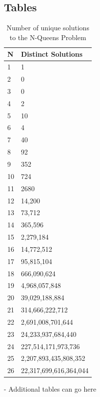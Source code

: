\documentclass{sig-alternate}
\begin{document}
\subsection{Tables} \label{tablesection}
\begin{table}
\centering
\caption{Number of unique solutions to the N-Queens Problem}
\begin{tabular}{|l|l|} \hline
N & Distinct Solutions      \\ \hline
1  & 1                      \\
2  & 0                      \\
3  & 0                      \\
4  & 2                      \\
5  & 10                     \\
6  & 4                      \\
7  & 40                     \\
8  & 92                     \\
9  & 352                    \\
10 & 724                    \\
11 & 2680                   \\
12 & 14,200                 \\
13 & 73,712                 \\
14 & 365,596                \\
15 & 2,279,184              \\
16 & 14,772,512             \\
17 & 95,815,104             \\
18 & 666,090,624            \\
19 & 4,968,057,848          \\
20 & 39,029,188,884         \\
21 & 314,666,222,712        \\
22 & 2,691,008,701,644      \\
23 & 24,233,937,684,440     \\
24 & 227,514,171,973,736    \\
25 & 2,207,893,435,808,352  \\
26 & 22,317,699,616,364,044 \\
\hline\end{tabular}
\label{table:numuniquesol}
\end{table}
- Additional tables can go here
\end{document}
